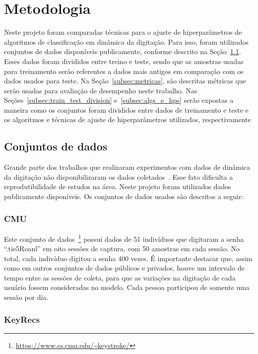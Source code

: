 \section{Metodologia}\label{sec:metodologia}

Neste projeto foram comparadas técnicas para o ajuste de hiperparâmetros de algoritmos de classificação em dinâmica da digitação. Para isso, foram utilizados conjuntos de dados disponíveis publicamente, conforme descrito na Seção~\ref{subsec:datasets}. Esses dados foram divididos entre treino e teste, sendo que as amostras usadas para treinamento serão referentes a dados mais antigos em comparação com os dados usados para teste. Na Seção~\ref{subsec:metricas}, são descritas métricas que serão usadas para avaliação de desempenho neste trabalho. Nas Seções~\ref{subsec:train_test_division} e~\ref{subsec:algs_e_hps} serão expostas a maneira como os conjuntos foram divididos entre dados de treinamento e teste e os algoritmos e técnicas de ajuste de hiperparâmetros utilizados, respectivamente


\subsection{Conjuntos de dados}\label{subsec:datasets}

Grande parte dos trabalhos que realizaram experimentos com dados de dinâmica da digitação não disponibilizaram os dados coletados~\cite{Roy2022systematic}. Esse fato dificulta a reprodutibilidade de estudos na área. Neste projeto foram utilizados dados publicamente disponíveis. Os conjuntos de dados usados são descritos a seguir:


\subsubsection{CMU}\label{subsubsec:cmu}

Este conjunto de dados~\footnote{\url{https://www.cs.cmu.edu/~keystroke/}} possui dados de 51 indivíduos que digitaram a senha ``.tie5Roanl'' em oito sessões de captura, com 50 amostras em cada sessão. No total, cada indivíduo digitou a senha 400 vezes. É importante destacar que, assim como em outros conjuntos de dados públicos e privados, houve um intervalo de tempo entre as sessões de coleta, para que as variações na digitação de cada usuário fossem consideradas no modelo. Cada pessoa participou de somente uma sessão por dia.


\subsubsection{KeyRecs}\label{subsubsec:keyrecs}

